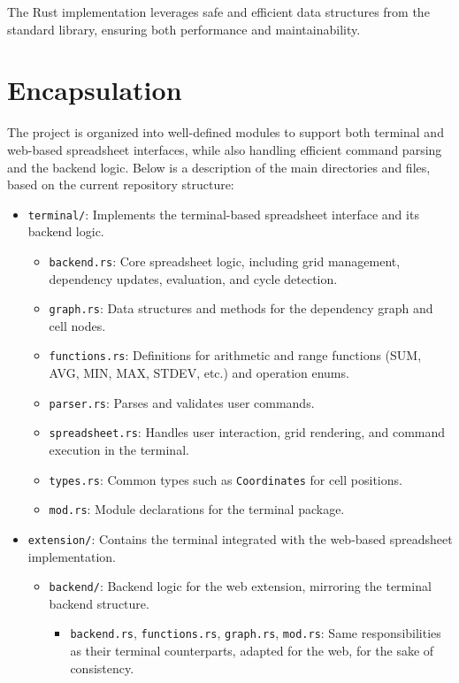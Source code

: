 \documentclass{article}
\begin{document}
\noindent
The Rust implementation leverages safe and efficient data structures from the standard library, ensuring both performance and maintainability.

\section{Encapsulation}

The project is organized into well-defined modules to support both terminal and web-based spreadsheet interfaces, while also handling efficient command parsing and the backend logic. Below is a description of the main directories and files, based on the current repository structure:

\begin{itemize}
    \item \texttt{terminal/}: Implements the terminal-based spreadsheet interface and its backend logic.
    \begin{itemize}
        \item \texttt{backend.rs}: Core spreadsheet logic, including grid management, dependency updates, evaluation, and cycle detection.
        \item \texttt{graph.rs}: Data structures and methods for the dependency graph and cell nodes.
        \item \texttt{functions.rs}: Definitions for arithmetic and range functions (SUM, AVG, MIN, MAX, STDEV, etc.) and operation enums.
        \item \texttt{parser.rs}: Parses and validates user commands.
        \item \texttt{spreadsheet.rs}: Handles user interaction, grid rendering, and command execution in the terminal.
        \item \texttt{types.rs}: Common types such as \texttt{Coordinates} for cell positions.
        \item \texttt{mod.rs}: Module declarations for the terminal package.
    \end{itemize}
    \item \texttt{extension/}: Contains the terminal integrated with the web-based spreadsheet implementation.
    \begin{itemize}
        \item \texttt{backend/}: Backend logic for the web extension, mirroring the terminal backend structure.
        \begin{itemize}
            \item \texttt{backend.rs}, \texttt{functions.rs}, \texttt{graph.rs}, \texttt{mod.rs}: Same responsibilities as their terminal counterparts, adapted for the web, for the sake of consistency.

\end{itemize}
\end{itemize}
\end{itemize}
\end{document}
